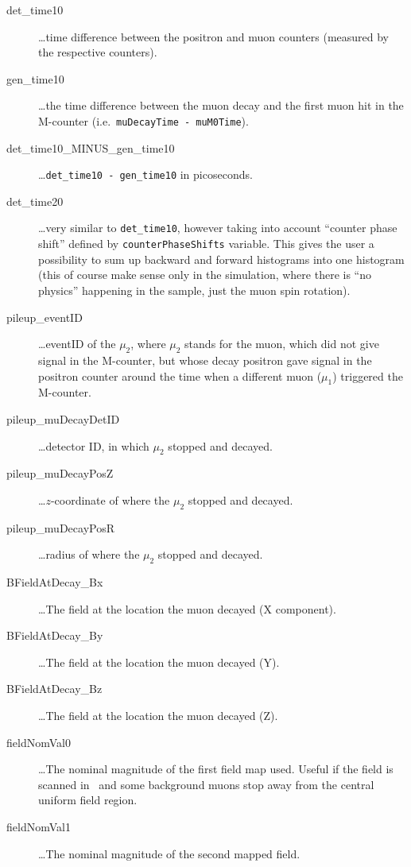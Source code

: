 \documentclass[twoside]{dis04}
\begin{document}
\begin{description}
\begin{description}
	   \item[det\_time10]         \ldots time difference between the positron and muon counters 
	                                     (measured by the respective counters).
	   \item[gen\_time10]         \ldots the time difference between the muon decay and the first muon hit 
	                                     in the M-counter (i.e.\ {\tt muDecayTime - muM0Time}).
	   \item[det\_time10\_MINUS\_gen\_time10] \ldots {\tt det\_time10 - gen\_time10} in picoseconds.
	   \item[det\_time20]          \ldots very similar to {\tt det\_time10}, however taking into
	                               account ``counter phase shift'' defined by {\tt counterPhaseShifts}
				       variable.  This gives the user a possibility to sum up backward and
				       forward histograms into one histogram (this of course make sense
				       only in the simulation, where there is ``no physics'' happening 
				       in the sample, just the muon spin rotation).
	   \item[pileup\_eventID]      \ldots eventID of the $\mu_2$, where $\mu_2$ stands for the muon, 
	                              which did not give signal in the M-counter, but whose
				      decay positron gave signal in the positron counter around the time 
				      when a different muon ($\mu_1$) triggered the M-counter.
	   \item[pileup\_muDecayDetID] \ldots detector ID, in which $\mu_2$ stopped and decayed. 
	   \item[pileup\_muDecayPosZ]  \ldots $z$-coordinate of where the $\mu_2$ stopped and decayed.
	   \item[pileup\_muDecayPosR]  \ldots radius of where the $\mu_2$ stopped and decayed.
	\item[BFieldAtDecay\_Bx]  \ldots The field at the location the muon decayed (X component).
	\item[BFieldAtDecay\_By]  \ldots The field at the location the muon decayed (Y).
	\item[BFieldAtDecay\_Bz]  \ldots The field at the location the muon decayed (Z).
	\item[fieldNomVal0] \ldots The nominal magnitude of the first field map used. Useful if the field is scanned in \musrSim \ and some background muons stop away from the central uniform field region.
	\item[fieldNomVal1] \ldots The nominal magnitude of the second mapped field.

\end{description}
\end{description}
\end{document}
